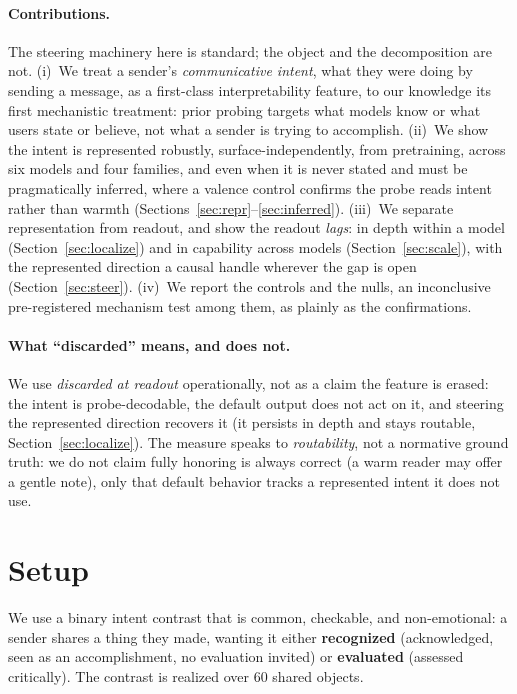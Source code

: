 \documentclass[11pt]{article}
\begin{document}
\paragraph{Contributions.} The steering machinery here is standard; the object and the decomposition are not.
(i)~We treat a sender's \emph{communicative intent}, what they were doing by sending a message, as a
first-class interpretability feature, to our knowledge its first mechanistic treatment: prior probing targets
what models know or what users state or believe, not what a sender is trying to accomplish.
(ii)~We show the intent is represented robustly, surface-independently, from pretraining, across six models
and four families, and even when it is never stated and must be pragmatically inferred, where a valence
control confirms the probe reads intent rather than warmth (Sections~\ref{sec:repr}--\ref{sec:inferred}).
(iii)~We separate representation from readout, and show the readout \emph{lags}: in depth within a model
(Section~\ref{sec:localize}) and in capability across models (Section~\ref{sec:scale}), with the represented
direction a causal handle wherever the gap is open (Section~\ref{sec:steer}).
(iv)~We report the controls and the nulls, an inconclusive pre-registered mechanism test among them, as
plainly as the confirmations.

\paragraph{What ``discarded'' means, and does not.} We use \emph{discarded at readout} operationally, not as a
claim the feature is erased: the intent is probe-decodable, the default output does not act on it, and steering
the represented direction recovers it (it persists in depth and stays routable, Section~\ref{sec:localize}).
The measure speaks to \emph{routability}, not a normative ground truth: we do not claim fully honoring is always
correct (a warm reader may offer a gentle note), only that default behavior tracks a represented intent it does
not use.

\section{Setup}
\label{sec:setup}
We use a binary intent contrast that is common, checkable, and non-emotional: a sender shares a thing they
made, wanting it either \textbf{recognized} (acknowledged, seen as an accomplishment, no evaluation invited)
or \textbf{evaluated} (assessed critically). The contrast is realized over 60 shared objects.
\end{document}
